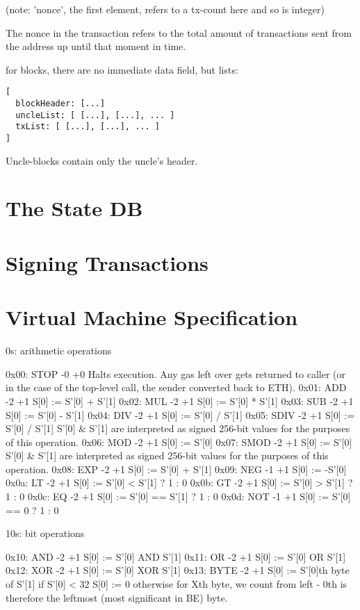 \documentclass[9pt,oneside]{amsart}
\begin{document}
\begin{multicols}{2}
(note: 'nonce', the first element, refers to a tx-count here and so is integer)

The nonce in the transaction refers to the total amount of transactions sent from the address up until that moment in time.

for blocks, there are no immediate data field, but lists:

\begin{verbatim}
[
  blockHeader: [...]
  uncleList: [ [...], [...], ... ]
  txList: [ [...], [...], ... ]
]
\end{verbatim}

Uncle-blocks contain only the uncle's header.

\section{The State DB}\label{app:state}

\section{Signing Transactions}\label{app:signing}

\section{Virtual Machine Specification}\label{app:vm}

0s: arithmetic operations

0x00: STOP -0 +0
Halts execution.
Any gas left over gets returned to caller (or in the case of the top-level call, the sender converted back to ETH).
0x01: ADD -2 +1
S[0] := S'[0] + S'[1]
0x02: MUL -2 +1
S[0] := S'[0] * S'[1]
0x03: SUB -2 +1
S[0] := S'[0] - S'[1]
0x04: DIV -2 +1
S[0] := S'[0] / S'[1]
0x05: SDIV -2 +1
S[0] := S'[0] / S'[1]
S'[0] \& S'[1] are interpreted as signed 256-bit values for the purposes of this operation.
0x06: MOD -2 +1
S[0] := S'[0] %
0x07: SMOD -2 +1
S[0] := S'[0] %
S'[0] \& S'[1] are interpreted as signed 256-bit values for the purposes of this operation.
0x08: EXP -2 +1
S[0] := S'[0] + S'[1]
0x09: NEG -1 +1
S[0] := -S'[0]
0x0a: LT -2 +1
S[0] := S'[0] < S'[1] ? 1 : 0
0x0b: GT -2 +1
S[0] := S'[0] > S'[1] ? 1 : 0
0x0c: EQ -2 +1
S[0] := S'[0] == S'[1] ? 1 : 0
0x0d: NOT -1 +1
S[0] := S'[0] == 0 ? 1 : 0

10s: bit operations

0x10: AND -2 +1
S[0] := S'[0] AND S'[1]
0x11: OR -2 +1
S[0] := S'[0] OR S'[1]
0x12: XOR -2 +1
S[0] := S'[0] XOR S'[1]
0x13: BYTE -2 +1
S[0] := S'[0]th byte of S'[1]
if S'[0] < 32
S[0] := 0
otherwise
for Xth byte, we count from left - 0th is therefore the leftmost (most significant in BE) byte.


\end{multicols}
\end{document}
